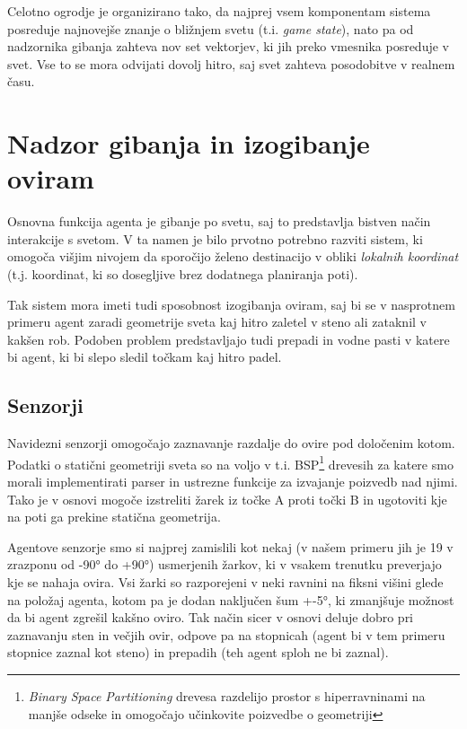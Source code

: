 \documentclass[a4paper,10pt]{article}
\begin{document}
Celotno ogrodje je organizirano tako, da najprej vsem komponentam sistema posreduje najnovejše znanje o bližnjem svetu (t.i. \textit{game state}), nato pa od nadzornika gibanja zahteva nov set vektorjev, ki jih preko vmesnika posreduje v svet. Vse to se mora odvijati dovolj hitro, saj svet zahteva posodobitve v realnem času.

\section{Nadzor gibanja in izogibanje oviram}

Osnovna funkcija agenta je gibanje po svetu, saj to predstavlja bistven način interakcije s svetom. V ta namen je bilo prvotno potrebno razviti sistem, ki omogoča višjim nivojem da sporočijo želeno destinacijo v obliki \textit{lokalnih koordinat} (t.j. koordinat, ki so dosegljive brez dodatnega planiranja poti).

Tak sistem mora imeti tudi sposobnost izogibanja oviram, saj bi se v nasprotnem primeru agent zaradi geometrije sveta kaj hitro zaletel v steno ali zataknil v kakšen rob. Podoben problem predstavljajo tudi prepadi in vodne pasti v katere bi agent, ki bi slepo sledil točkam kaj hitro padel.

\subsection{Senzorji}

Navidezni senzorji omogočajo zaznavanje razdalje do ovire pod določenim kotom. Podatki o statični geometriji sveta so na voljo v t.i. BSP\footnote{\textit{Binary Space Partitioning} drevesa razdelijo prostor s hiperravninami na manjše odseke in omogočajo učinkovite poizvedbe o geometriji} drevesih za katere smo morali implementirati parser in ustrezne funkcije za izvajanje poizvedb nad njimi. Tako je v osnovi mogoče izstreliti žarek iz točke A proti točki B in ugotoviti kje na poti ga prekine statična geometrija.

Agentove senzorje smo si najprej zamislili kot nekaj (v našem primeru jih je 19 v zrazponu od -90° do +90°) usmerjenih žarkov, ki v vsakem trenutku preverjajo kje se nahaja ovira. Vsi žarki so razporejeni v neki ravnini na fiksni višini glede na položaj agenta, kotom pa je dodan naključen šum +-5°, ki zmanjšuje možnost da bi agent zgrešil kakšno oviro. Tak način sicer v osnovi deluje dobro pri zaznavanju sten in večjih ovir, odpove pa na stopnicah (agent bi v tem primeru stopnice zaznal kot steno) in prepadih (teh agent sploh ne bi zaznal).
\end{document}
